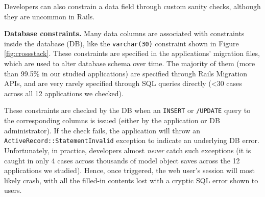Developers can also constrain a data field through custom sanity checks, although they are uncommon in Rails. 

 

\textbf{Database constraints.}  
Many data columns are associated with constraints inside the database (DB), like the {\tt varchar(30)} constraint shown in Figure \ref{fig:crossstack}. These constraints are specified in   the applications' migration files, which are used to alter database schema over time.
The majority of them (more than 99.5\%
in our studied applications) are specified through Rails Migration APIs, and are very rarely
specified through SQL queries directly (<30 cases
across all 12 applications we checked). 

These constraints are checked by the DB when an {\tt INSERT} or {\tt /UPDATE} query to the corresponding columns is issued (either by the application or DB administrator).
If the check fails, the application will throw an {\tt ActiveRecord::StatementInvalid}
exception to indicate an underlying DB error. 
Unfortunately, in practice, developers almost {\it never} catch such exceptions
(it is caught in only 4 cases across thousands of model object saves 
across the 12 applications we studied). Hence, once triggered,
the web user's session will most likely crash, with all the filled-in contents lost with a cryptic SQL error shown to users. 

